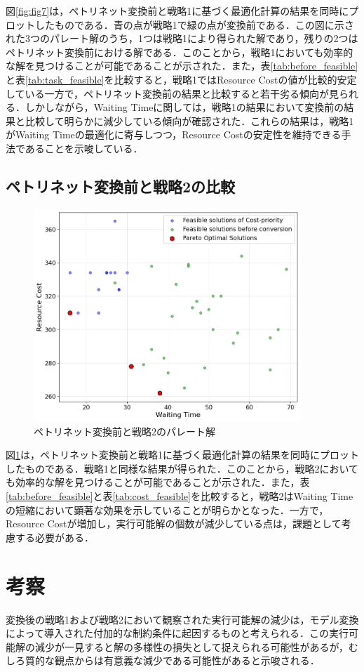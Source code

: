 図\ref{fig:fig7}は，ペトリネット変換前と戦略1に基づく最適化計算の結果を同時にプロットしたものである．青の点が戦略1で緑の点が変換前である．この図に示された3つのパレート解のうち，1つは戦略1により得られた解であり，残りの2つはペトリネット変換前における解である．このことから，戦略1においても効率的な解を見つけることが可能であることが示された．また，表\ref{tab:before_feasible}と表\ref{tab:task_feasible}を比較すると，戦略1ではResource Costの値が比較的安定している一方で，ペトリネット変換前の結果と比較すると若干劣る傾向が見られる．しかしながら，Waiting Timeに関しては，戦略1の結果において変換前の結果と比較して明らかに減少している傾向が確認された．これらの結果は，戦略1がWaiting Timeの最適化に寄与しつつ，Resource Costの安定性を維持できる手法であることを示唆している．

\subsection{ペトリネット変換前と戦略2の比較}
\begin{figure}[H]
    \centering
    \includegraphics[width=0.8\linewidth, height=8cm]{./images/cost_and_before.png}
    \caption{ペトリネット変換前と戦略2のパレート解}
    \label{fig:fig8}
\end{figure}

図\ref{fig:fig8}は，ペトリネット変換前と戦略1に基づく最適化計算の結果を同時にプロットしたものである．戦略1と同様な結果が得られた．このことから，戦略2においても効率的な解を見つけることが可能であることが示された．また，表\ref{tab:before_feasible}と表\ref{tab:cost_feasible}を比較すると，戦略2はWaiting Timeの短縮において顕著な効果を示していることが明らかとなった．一方で，Resource Costが増加し，実行可能解の個数が減少している点は，課題として考慮する必要がある．

\section{考察}
変換後の戦略1および戦略2において観察された実行可能解の減少は，モデル変換によって導入された付加的な制約条件に起因するものと考えられる．この実行可能解の減少が一見すると解の多様性の損失として捉えられる可能性があるが，むしろ質的な観点からは有意義な減少である可能性があると示唆される．

